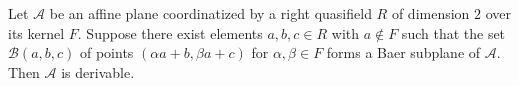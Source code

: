 Let $\mathcal{A}$ be an affine plane coordinatized by a right quasifield $R$ of dimension $2$ over its kernel $F$. Suppose there exist elements $a, b, c \in R$ with $a \notin F$ such that the set $\mathcal{B}(a, b, c)$ of points $(\alpha a + b, \beta a + c)$ for $\alpha, \beta \in F$ forms a Baer subplane of $\mathcal{A}$. Then $\mathcal{A}$ is derivable.
